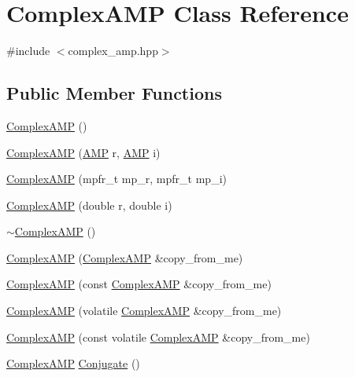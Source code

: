 \hypertarget{class_complex_a_m_p}{\section{Complex\+A\+M\+P Class Reference}
\label{class_complex_a_m_p}
}


{\ttfamily \#include $<$complex\+\_\+amp.\+hpp$>$}

\subsection*{Public Member Functions}
\begin{DoxyCompactItemize}
\item 
\hyperlink{class_complex_a_m_p_a761e3ad1cffb6b430c9506350daeee7c}{Complex\+A\+M\+P} ()
\item 
\hyperlink{class_complex_a_m_p_a2e4e3a1c65d6255d7403dcf779fdc56f}{Complex\+A\+M\+P} (\hyperlink{class_a_m_p}{A\+M\+P} r, \hyperlink{class_a_m_p}{A\+M\+P} i)
\item 
\hyperlink{class_complex_a_m_p_a03a6196657f98a6b03e186f270edf6a4}{Complex\+A\+M\+P} (mpfr\+\_\+t mp\+\_\+r, mpfr\+\_\+t mp\+\_\+i)
\item 
\hyperlink{class_complex_a_m_p_a9e2cf3c6757e669b0c5e3c0a5a5c4bce}{Complex\+A\+M\+P} (double r, double i)
\item 
\hyperlink{class_complex_a_m_p_aa00c27201d3c690df6c40de6e587ab22}{$\sim$\+Complex\+A\+M\+P} ()
\item 
\hyperlink{class_complex_a_m_p_a61b4ce319592d4d298d8ab0082f95a92}{Complex\+A\+M\+P} (\hyperlink{class_complex_a_m_p}{Complex\+A\+M\+P} \&copy\+\_\+from\+\_\+me)
\item 
\hyperlink{class_complex_a_m_p_adb4464a3f59098b37b2109a12f9f33df}{Complex\+A\+M\+P} (const \hyperlink{class_complex_a_m_p}{Complex\+A\+M\+P} \&copy\+\_\+from\+\_\+me)
\item 
\hyperlink{class_complex_a_m_p_a880a526fcb17d87111cfe461fb705543}{Complex\+A\+M\+P} (volatile \hyperlink{class_complex_a_m_p}{Complex\+A\+M\+P} \&copy\+\_\+from\+\_\+me)
\item 
\hyperlink{class_complex_a_m_p_a58c83fe476969c9c3cf871ca3e214181}{Complex\+A\+M\+P} (const volatile \hyperlink{class_complex_a_m_p}{Complex\+A\+M\+P} \&copy\+\_\+from\+\_\+me)
\item 
\hyperlink{class_complex_a_m_p}{Complex\+A\+M\+P} \hyperlink{class_complex_a_m_p_a1716f29c710221dd573f5e76b1bd34ee}{Conjugate} ()
\item 

\end{DoxyCompactItemize}

